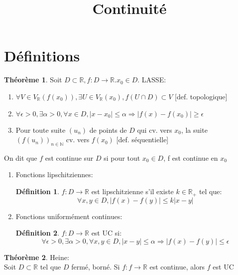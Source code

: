 \documentclass[fleqn]{article}
\title{Continuit\'e}
\date{}
\theoremstyle{definition} \newtheorem*{defi}{D\'efinition}
\theoremstyle{definition} \newtheorem*{theo}{Th\'eor\`eme}
\theoremstyle{definition} \newtheorem*{coro}{Corollaire}
\begin{document}
\maketitle

\section{D\'efinitions}
\begin{theo}
	Soit $D \subset \mathbb{R}, f:D \rightarrow \mathbb{R}. x_0 \in D$. LASSE:
	\begin{enumerate}
		\item $\forall V \in V_\mathbb{R}(f(x_0)), \exists U \in V_\mathbb{R}(x_0), f(U \cap D) \subset V$ [def. topologique]
		\item $\forall \epsilon>0, \exists \alpha > 0, \forall x \in D, |x-x_0| \leq \alpha \Rightarrow |f(x) - f(x_0)| \geq \epsilon$
		\item Pour toute suite $(u_n)$ de points de $D$ qui cv. vers $x_0$, la suite $(f(u_n))_{n\in\mathbb{N}}$ cv. vers $f(x_0)$
		[def. s\'equentielle]
	\end{enumerate}
	On dit que $f$ est continue sur $D$ si pour tout $x_0 \in D$, f est continue en $x_0$
\end{theo}
\begin{enumerate}
	\item Fonctions lipschitziennes:
		\begin{defi}
			$f:D \rightarrow \mathbb{R}$ est lipschitzienne s'il existe $k \in \mathbb{R}_+$ tel que:
			\[\forall x,y \in D, |f(x) - f(y)| \leq k|x-y|\]
		\end{defi}
	\item Fonctions uniform\'ement continues:
		\begin{defi}
			$f:D \rightarrow \mathbb{R}$ est UC si:
			\[\forall \epsilon >0, \exists \alpha>0, \forall x,y \in D, |x-y| \leq \alpha \Rightarrow |f(x) - f(y)| \leq \epsilon\]
		\end{defi}
\end{enumerate}
\begin{theo} Heine: \\
	Soit $D \subset \mathbb{R}$ tel que $D$ ferm\'e, born\'e. Si $f:f \rightarrow \mathbb{R}$ est continue, alors $f$ est UC
\end{theo}
\end{document}

